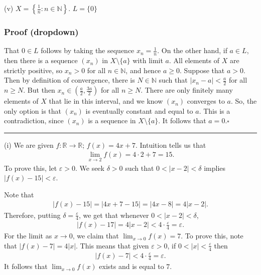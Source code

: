 \documentclass[letterpaper,10pt,english]{jupyterBook}
\begin{document}
\sphinxAtStartPar
(v) \(X=\displaystyle\left\{\frac{1}{n}:n\in\mathbb{N}\right\}\).  \(L=\{0\}\)
\subsubsection*{Proof (dropdown)}

\sphinxAtStartPar
That \(0\in L\) follows by taking the sequence \(x_n=\frac{1}{n}\). On the other hand, if \(a\in L\), then there is a sequence \((x_n)\) in \(X\setminus\{a\}\) with limit \(a\). All elements of \(X\) are strictly positive, so \(x_n>0\) for all \(n\in\mathbb{N}\), and hence \(a\geq 0\). Suppose that \(a>0\). Then by definition of convergence, there is \(N\in\mathbb{N}\) such that \(|x_n-a|<\frac{a}{2}\) for all \(n\geq N\). But then \(x_n\in\left(\frac{a}{2},\frac{3a}{2}\right)\) for all \(n\geq N\). There are only finitely many elements of \(X\) that lie in this interval, and we know \((x_n)\) converges to \(a\). So, the only option is that \((x_n)\) is eventually constant and equal to \(a\). This is a contradiction, since \((x_n)\) is a sequence in \(X\setminus\{a\}\). It follows that \(a=0\).\(\square\)


\bigskip\hrule\bigskip

\label{\detokenize{Solutions-upto46:id2}}
\sphinxAtStartPar
{\hyperref[\detokenize{Problems:id3}]{}} 

\sphinxAtStartPar
(i) We are given \(f:\mathbb{R}\to\mathbb{R}\); \(f(x)=4x+7\). Intuition tells us that
\begin{equation*}
\begin{split}
\lim_{x\rightarrow 2}f(x) = 4\cdot 2+7 = 15.
\end{split}
\end{equation*}
\sphinxAtStartPar
To prove this, let \(\varepsilon>0\). We seek \(\delta>0\) such that \(0<|x-2|<\delta\) implies \(|f(x)-15|<\varepsilon\).

\sphinxAtStartPar
Note that
\begin{equation*}
\begin{split}
|f(x)-15| = |4x+7-15| = |4x-8| = 4|x-2|.
\end{split}
\end{equation*}
\sphinxAtStartPar
Therefore, putting \(\delta=\frac{\varepsilon}{4}\), we get that whenever \(0<|x-2|<\delta\),
\begin{equation*}
\begin{split}
|f(x)-17| = 4|x-2| < 4\cdot\frac{\varepsilon}{4} = \varepsilon.
\end{split}
\end{equation*}
\sphinxAtStartPar
For the limit as \(x\rightarrow 0\), we claim that \(\lim_{x\rightarrow 0}f(x)=7\). To prove this, note that \(|f(x)-7|=4|x|\). This means that given \(\varepsilon>0\), if \(0<|x|<\frac{\varepsilon}{4}\) then
\begin{equation*}
\begin{split}
|f(x)-7|<4\cdot\frac{\varepsilon}{4} = \varepsilon.
\end{split}
\end{equation*}
\sphinxAtStartPar
It follows that \(\lim_{x\rightarrow 0}f(x)\) exists and is equal to \(7\).
\end{document}
